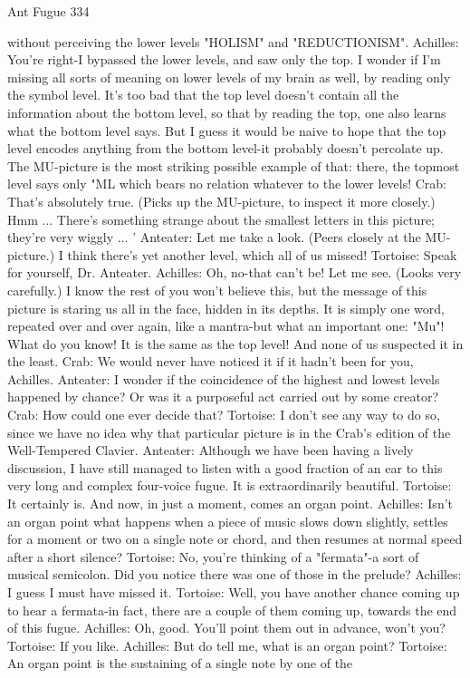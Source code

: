 Ant Fugue                                                                                334

    without perceiving the lower levels "HOLISM" and "REDUCTIONISM".
Achilles: You're right-I bypassed the lower levels, and saw only the top. I wonder if I'm
    missing all sorts of meaning on lower levels of my brain as well, by reading only the
    symbol level. It's too bad that the top level doesn't contain all the information about
    the bottom level, so that by reading the top, one also learns what the bottom level
    says. But I guess it would be naive to hope that the top level encodes anything from
    the bottom level-it probably doesn't percolate up. The MU-picture is the most striking
    possible example of that: there, the topmost level says only "ML which bears no
    relation whatever to the lower levels!
Crab: That's absolutely true. (Picks up the MU-picture, to inspect it more closely.) Hmm
    ... There's something strange about the smallest letters in this picture; they're very
    wiggly ... '
Anteater: Let me take a look. (Peers closely at the MU-picture.) I think there's yet
    another level, which all of us missed!
Tortoise: Speak for yourself, Dr. Anteater.
Achilles: Oh, no-that can't be! Let me see. (Looks very carefully.) I know the rest of you
    won't believe this, but the message of this picture is staring us all in the face, hidden
    in its depths. It is simply one word, repeated over and over again, like a mantra-but
    what an important one: "Mu"! What do you know! It is the same as the top level!
    And none of us suspected it in the least.
Crab: We would never have noticed it if it hadn't been for you, Achilles. Anteater: I
    wonder if the coincidence of the highest and lowest levels happened by chance? Or
    was it a purposeful act carried out by some creator?
Crab: How could one ever decide that?
Tortoise: I don't see any way to do so, since we have no idea why that particular picture is
    in the Crab's edition of the Well-Tempered Clavier. Anteater: Although we have been
    having a lively discussion, I have still managed to listen with a good fraction of an
    ear to this very long and complex four-voice fugue. It is extraordinarily beautiful.
Tortoise: It certainly is. And now, in just a moment, comes an organ point.
Achilles: Isn't an organ point what happens when a piece of music slows down slightly,
    settles for a moment or two on a single note or chord, and then resumes at normal
    speed after a short silence?
Tortoise: No, you're thinking of a "fermata"-a sort of musical semicolon. Did you notice
    there was one of those in the prelude?
Achilles: I guess I must have missed it.
Tortoise: Well, you have another chance coming up to hear a fermata-in fact, there are a
    couple of them coming up, towards the end of this fugue.
Achilles: Oh, good. You'll point them out in advance, won't you? Tortoise: If you like.
Achilles: But do tell me, what is an organ point?
Tortoise: An organ point is the sustaining of a single note by one of the




